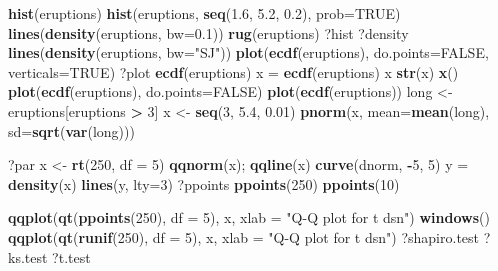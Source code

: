 \documentclass[11pt,]{krantz}
\makeatletter
\newenvironment{Shaded}{\begin{snugshade}}{\end{snugshade}}
\newcommand{\KeywordTok}[1]{\textcolor[rgb]{0.13,0.29,0.53}{\textbf{#1}}}
\newcommand{\DataTypeTok}[1]{\textcolor[rgb]{0.13,0.29,0.53}{#1}}
\newcommand{\DecValTok}[1]{\textcolor[rgb]{0.00,0.00,0.81}{#1}}
\newcommand{\FloatTok}[1]{\textcolor[rgb]{0.00,0.00,0.81}{#1}}
\newcommand{\StringTok}[1]{\textcolor[rgb]{0.31,0.60,0.02}{#1}}
\newcommand{\OtherTok}[1]{\textcolor[rgb]{0.56,0.35,0.01}{#1}}
\newcommand{\OperatorTok}[1]{\textcolor[rgb]{0.81,0.36,0.00}{\textbf{#1}}}
\newcommand{\NormalTok}[1]{#1}
\newenvironment{kframe}{%
\medskip{}
\setlength{\fboxsep}{.8em}
 \def\at@end@of@kframe{}%
 \ifinner\ifhmode%
  \def\at@end@of@kframe{\end{minipage}}%
  \begin{minipage}{\columnwidth}%
 \fi\fi%
 \def\FrameCommand##1{\hskip\@totalleftmargin \hskip-\fboxsep
 \colorbox{shadecolor}{##1}\hskip-\fboxsep
     \hskip-\linewidth \hskip-\@totalleftmargin \hskip\columnwidth}%
 \MakeFramed {\advance\hsize-\width
   \@totalleftmargin\z@ \linewidth\hsize
   \@setminipage}}%
 {\par\unskip\endMakeFramed%
 \at@end@of@kframe}
\renewenvironment{Shaded}{\begin{kframe}}{\end{kframe}}
\theoremstyle{definition}
\theoremstyle{definition}
\theoremstyle{remark}
\makeatother
\begin{document}
\begin{Shaded}
\begin{Highlighting}[]
\KeywordTok{hist}\NormalTok{(eruptions)}
\KeywordTok{hist}\NormalTok{(eruptions, }\KeywordTok{seq}\NormalTok{(}\FloatTok{1.6}\NormalTok{, }\FloatTok{5.2}\NormalTok{, }\FloatTok{0.2}\NormalTok{), }\DataTypeTok{prob=}\OtherTok{TRUE}\NormalTok{)}
\KeywordTok{lines}\NormalTok{(}\KeywordTok{density}\NormalTok{(eruptions, }\DataTypeTok{bw=}\FloatTok{0.1}\NormalTok{))}
\KeywordTok{rug}\NormalTok{(eruptions)}
\NormalTok{?hist}
\NormalTok{?density}
\KeywordTok{lines}\NormalTok{(}\KeywordTok{density}\NormalTok{(eruptions, }\DataTypeTok{bw=}\StringTok{"SJ"}\NormalTok{))}
\KeywordTok{plot}\NormalTok{(}\KeywordTok{ecdf}\NormalTok{(eruptions), }\DataTypeTok{do.points=}\OtherTok{FALSE}\NormalTok{, }\DataTypeTok{verticals=}\OtherTok{TRUE}\NormalTok{)}
\NormalTok{?plot}
\KeywordTok{ecdf}\NormalTok{(eruptions)}
\NormalTok{x =}\StringTok{ }\KeywordTok{ecdf}\NormalTok{(eruptions)}
\NormalTok{x}
\KeywordTok{str}\NormalTok{(x)}
\KeywordTok{x}\NormalTok{()}
\KeywordTok{plot}\NormalTok{(}\KeywordTok{ecdf}\NormalTok{(eruptions), }\DataTypeTok{do.points=}\OtherTok{FALSE}\NormalTok{)}
\KeywordTok{plot}\NormalTok{(}\KeywordTok{ecdf}\NormalTok{(eruptions))}
\NormalTok{long <-}\StringTok{ }\NormalTok{eruptions[eruptions }\OperatorTok{>}\StringTok{ }\DecValTok{3}\NormalTok{]}
\NormalTok{x <-}\StringTok{ }\KeywordTok{seq}\NormalTok{(}\DecValTok{3}\NormalTok{, }\FloatTok{5.4}\NormalTok{, }\FloatTok{0.01}\NormalTok{)}
\KeywordTok{pnorm}\NormalTok{(x, }\DataTypeTok{mean=}\KeywordTok{mean}\NormalTok{(long), }\DataTypeTok{sd=}\KeywordTok{sqrt}\NormalTok{(}\KeywordTok{var}\NormalTok{(long)))}

\NormalTok{?par}
\NormalTok{x <-}\StringTok{ }\KeywordTok{rt}\NormalTok{(}\DecValTok{250}\NormalTok{, }\DataTypeTok{df =} \DecValTok{5}\NormalTok{)}
\KeywordTok{qqnorm}\NormalTok{(x); }\KeywordTok{qqline}\NormalTok{(x)}
\KeywordTok{curve}\NormalTok{(dnorm, }\OperatorTok{-}\DecValTok{5}\NormalTok{, }\DecValTok{5}\NormalTok{)}
\NormalTok{y =}\StringTok{ }\KeywordTok{density}\NormalTok{(x)}
\KeywordTok{lines}\NormalTok{(y, }\DataTypeTok{lty=}\DecValTok{3}\NormalTok{)}
\NormalTok{?ppoints}
\KeywordTok{ppoints}\NormalTok{(}\DecValTok{250}\NormalTok{)}
\KeywordTok{ppoints}\NormalTok{(}\DecValTok{10}\NormalTok{)}

\KeywordTok{qqplot}\NormalTok{(}\KeywordTok{qt}\NormalTok{(}\KeywordTok{ppoints}\NormalTok{(}\DecValTok{250}\NormalTok{), }\DataTypeTok{df =} \DecValTok{5}\NormalTok{), x, }\DataTypeTok{xlab =} \StringTok{"Q-Q plot for t dsn"}\NormalTok{)}
\KeywordTok{windows}\NormalTok{()}
\KeywordTok{qqplot}\NormalTok{(}\KeywordTok{qt}\NormalTok{(}\KeywordTok{runif}\NormalTok{(}\DecValTok{250}\NormalTok{), }\DataTypeTok{df =} \DecValTok{5}\NormalTok{), x, }\DataTypeTok{xlab =} \StringTok{"Q-Q plot for t dsn"}\NormalTok{)}
\NormalTok{?shapiro.test}
\NormalTok{?ks.test}
\NormalTok{?t.test}



\end{Highlighting}
\end{Shaded}
\end{document}
